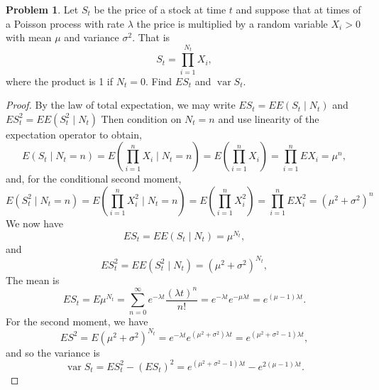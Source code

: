 \documentclass[oneside]{amsart}
\DeclareMathOperator{\var}{\mathrm{var}}
\theoremstyle{definition}
\newtheorem{prob}{Problem}
\begin{document}
\begin{prob}
Let $S_t$ be the price of a stock at time $t$ and suppose that at times of a Poisson process with rate $\lambda$ the price is multiplied by a random variable $X_i >0$ with mean $\mu$ and variance $\sigma^2$. That is 
\[
	S_t = \prod_{i=1}^{N_t} X_i,
\]
where the product is 1 if $N_t = 0$. Find $E S_t$ and $\var S_t$.
\end{prob}

\begin{proof}
By the law of total expectation, we may write $E S_t = EE(S_t \mid N_t)$ and $E S_t^2 = EE(S_t^2 \mid N_t)$ Then condition on $N_t = n$ and use linearity of the expectation operator to obtain,
\[
	E (S_t \mid N_t = n) = E \left( \prod_{i=1}^n X_i \mid N_t = n \right)
	= E \left( \prod_{i=1}^n X_i \right)
	=  \prod_{i=1}^n E X_i 
	= \mu^n,
\]
and, for the conditional second moment, 
\[
	E(S_t^2 \mid N_t = n) = E \left( \prod_{i=1}^n X_i^2 \mid N_t = n \right)
	= E \left( \prod_{i=1}^n X_i^2 \right)
	=  \prod_{i=1}^n E X_i^2  
	= (\mu^2 + \sigma^2 )^n
\]
We now have 
\[
	E S_t = E E (S_t \mid N_t) = \mu^{N_t}, 
\]
and 
\[
	E S_t^2 = E E (S_t^2 \mid N_t) = (\mu^2 + \sigma^2)^{N_t}, 
\]
The mean is 
\[
	E S_t = E \mu^{N_t} 
	= \sum_{n=0}^\infty e^{-\lambda t} \frac{(\lambda t)^n}{n!} 
	=e^{-\lambda t}e^{-\mu \lambda t}
	= e^{(\mu - 1)\lambda t}.
\]
For the second moment, we have 
\[
	E S^2 = E  (\mu^2 + \sigma^2)^{N_t} 
	= e^{-\lambda t} e^{(\mu^2+ \sigma^2)\lambda t} 
	= e^{(\mu^2 + \sigma^2 -1)\lambda t},
\]
and so the variance is
\[
	\var S_t = E S_t^2 - (E S_t)^2 = e^{(\mu^2 + \sigma^2 -1)\lambda t} - e^{2(\mu - 1)\lambda t}.
\]
\end{proof}
\end{document}
